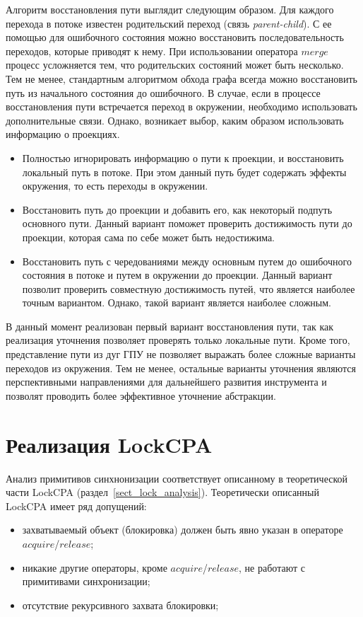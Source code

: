 Алгоритм восстановления пути выглядит следующим образом.
Для каждого перехода в потоке известен родительский переход (связь \textit{parent-child}).
С ее помощью для ошибочного состояния можно восстановить последовательность переходов, которые приводят к нему.
При использовании оператора $merge$ процесс усложняется тем, что родительских состояний может быть несколько.
Тем не менее, стандартным алгоритмом обхода графа всегда можно восстановить путь из начального состояния до ошибочного.
В случае, если в процессе восстановления пути встречается переход в окружении, необходимо использовать дополнительные связи.
Однако, возникает выбор, каким образом использовать информацию о проекциях.
\begin{itemize}
\item Полностью игнорировать информацию о пути к проекции, и восстановить локальный путь в потоке.
При этом данный путь будет содержать эффекты окружения, то есть переходы в окружении.
\item Восстановить путь до проекции и добавить его, как некоторый подпуть основного пути. 
Данный вариант поможет проверить достижимость пути до проекции, которая сама по себе может быть недостижима.
\item Восстановить путь с чередованиями между основным путем до ошибочного состояния в потоке и путем в окружении до проекции.
Данный вариант позволит проверить совместную достижимость путей, что является наиболее точным вариантом.
Однако, такой вариант является наиболее сложным.
\end{itemize}

В данный момент реализован первый вариант восстановления пути, так как реализация уточнения позволяет проверять только локальные пути. 
Кроме того, представление пути из дуг ГПУ не позволяет выражать более сложные варианты переходов из окружения.
Тем не менее, остальные варианты уточнения являются перспективными направлениями для дальнейшего развития инструмента и позволят проводить более эффективное уточнение абстракции.

\section{Реализация LockCPA}
\label{sect_impl_lock}
Анализ примитивов синхнонизации соответствует описанному в теоретической части LockCPA (раздел~\ref{sect_lock_analysis}).
Теоретически описанный LockCPA имеет ряд допущений:
\begin{itemize}
\item захватываемый объект (блокировка) должен быть явно указан в операторе $acquire$/$release$;
\item никакие другие операторы, кроме $acquire$/$release$, не работают с примитивами синхронизации;
\item отсутствие рекурсивного захвата блокировки;
\end{itemize}

